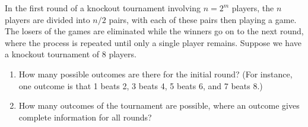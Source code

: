 \begin{exampleboxbreak}{}
    In the first round of a knockout tournament involving $n = 2^m$ players, the $n$ players are divided into $n/2$ pairs, with each of these pairs then playing a game. The losers of the games are eliminated while the winners go on to the next round, where the process is repeated until only a single player remains. Suppose we have a knockout tournament of 8 players.

\begin{enumerate}[label=(\alph*)]
    \item How many possible outcomes are there for the initial round? (For instance, one outcome is that 1 beats 2, 3 beats 4, 5 beats 6, and 7 beats 8.)
    \item How many outcomes of the tournament are possible, where an outcome gives complete information for all rounds?
\end{enumerate}


\end{exampleboxbreak}


